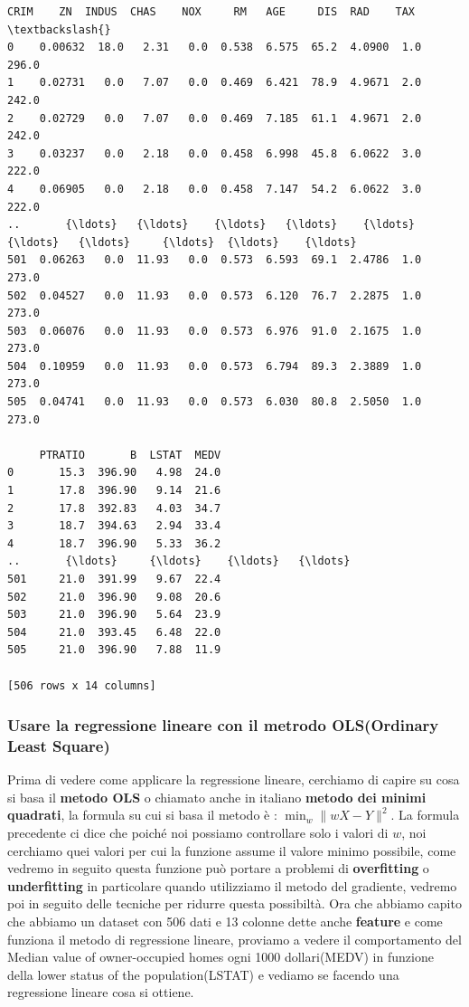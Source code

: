 \documentclass[11pt]{article}
\begin{document}
    
    \begin{Verbatim}[commandchars=\\\{\}]
        CRIM    ZN  INDUS  CHAS    NOX     RM   AGE     DIS  RAD    TAX  \textbackslash{}
0    0.00632  18.0   2.31   0.0  0.538  6.575  65.2  4.0900  1.0  296.0   
1    0.02731   0.0   7.07   0.0  0.469  6.421  78.9  4.9671  2.0  242.0   
2    0.02729   0.0   7.07   0.0  0.469  7.185  61.1  4.9671  2.0  242.0   
3    0.03237   0.0   2.18   0.0  0.458  6.998  45.8  6.0622  3.0  222.0   
4    0.06905   0.0   2.18   0.0  0.458  7.147  54.2  6.0622  3.0  222.0   
..       {\ldots}   {\ldots}    {\ldots}   {\ldots}    {\ldots}    {\ldots}   {\ldots}     {\ldots}  {\ldots}    {\ldots}   
501  0.06263   0.0  11.93   0.0  0.573  6.593  69.1  2.4786  1.0  273.0   
502  0.04527   0.0  11.93   0.0  0.573  6.120  76.7  2.2875  1.0  273.0   
503  0.06076   0.0  11.93   0.0  0.573  6.976  91.0  2.1675  1.0  273.0   
504  0.10959   0.0  11.93   0.0  0.573  6.794  89.3  2.3889  1.0  273.0   
505  0.04741   0.0  11.93   0.0  0.573  6.030  80.8  2.5050  1.0  273.0   

     PTRATIO       B  LSTAT  MEDV  
0       15.3  396.90   4.98  24.0  
1       17.8  396.90   9.14  21.6  
2       17.8  392.83   4.03  34.7  
3       18.7  394.63   2.94  33.4  
4       18.7  396.90   5.33  36.2  
..       {\ldots}     {\ldots}    {\ldots}   {\ldots}  
501     21.0  391.99   9.67  22.4  
502     21.0  396.90   9.08  20.6  
503     21.0  396.90   5.64  23.9  
504     21.0  393.45   6.48  22.0  
505     21.0  396.90   7.88  11.9  

[506 rows x 14 columns]
    \end{Verbatim}

    
    \hypertarget{usare-la-regressione-lineare-con-il-metrodo-olsordinary-least-square}{%
\subsubsection{Usare la regressione lineare con il metrodo OLS(Ordinary
Least
Square)}\label{usare-la-regressione-lineare-con-il-metrodo-olsordinary-least-square}}

Prima di vedere come applicare la regressione lineare, cerchiamo di
capire su cosa si basa il \textbf{metodo OLS} o chiamato anche in
italiano \textbf{metodo dei minimi quadrati}, la formula su cui si basa
il metodo è : \(\min_{w} \parallel wX - Y \parallel^2\). La formula
precedente ci dice che poiché noi possiamo controllare solo i valori di
\(w\), noi cerchiamo quei valori per cui la funzione assume il valore
minimo possibile, come vedremo in seguito questa funzione può portare a
problemi di \textbf{overfitting} o \textbf{underfitting} in particolare
quando utilizziamo il metodo del gradiente, vedremo poi in seguito delle
tecniche per ridurre questa possibiltà. Ora che abbiamo capito che
abbiamo un dataset con 506 dati e 13 colonne dette anche
\textbf{feature} e come funziona il metodo di regressione lineare,
proviamo a vedere il comportamento del Median value of owner-occupied
homes ogni 1000 dollari(MEDV) in funzione della lower status of the
population(LSTAT) e vediamo se facendo una regressione lineare cosa si
ottiene.
\end{document}
